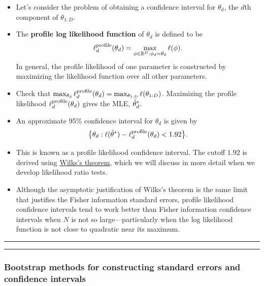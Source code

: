 \documentclass[]{article}
\begin{document}
\begin{itemize}
\item
  Let's consider the problem of obtaining a confidence interval for
  \(\theta_d\), the \(d\)th component of \(\theta_{1:D}\).
\item
  The \textbf{profile log likelihood function} of \(\theta_d\) is
  defined to be
  \[ \ell^\mathrm{profile}_d(\theta_d) = \max_{\phi\in\mathbb{R}^D: \phi_d=\theta_d}\ell(\phi).\]
  In general, the profile likelihood of one parameter is constructed by
  maximizing the likelihood function over all other parameters.
\item
  Check that
  \(\max_{\theta_d}\ell^\mathrm{profile}_d(\theta_d) = \max_{\theta_{1:D}}\ell(\theta_{1:D})\).
  Maximizing the profile likelihood \(\ell^\mathrm{profile}_d(\theta_d)\)
  gives the MLE, \(\hat\theta_d^*\).
\item
  An approximate 95\% confidence interval for \(\theta_d\) is given by
  \[ \big\{\theta_d : \ell(\hat\theta^*) - \ell^\mathrm{profile}_d(\theta_d)< 1.92\big\}.\]
\item
  This is known as a profile likelihood confidence interval. The cutoff
  \(1.92\) is derived using
  \href{https://en.wikipedia.org/wiki/Likelihood-ratio_test\#Distribution:_Wilks.27s_theorem}{Wilks's
  theorem}, which we will discuss in more detail when we develop
  likelihood ratio tests.
\item
  Although the asymptotic justification of Wilks's theorem is the same
  limit that justifies the Fisher information standard errors, profile
  likelihood confidence intervals tend to work better than Fisher
  information confidence intervals when \(N\) is not so
  large---particularly when the log likelihood function is not close to
  quadratic near its maximum.
\end{itemize}

\begin{center}\rule{0.5\linewidth}{\linethickness}\end{center}

\begin{center}\rule{0.5\linewidth}{\linethickness}\end{center}

\subsubsection{Bootstrap methods for constructing standard errors and
confidence
intervals}\label{bootstrap-methods-for-constructing-standard-errors-and-confidence-intervals}
\end{document}
